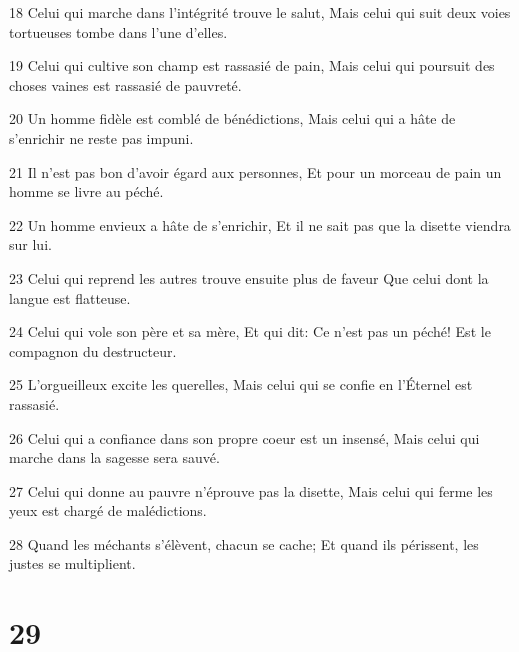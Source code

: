 \par 18 Celui qui marche dans l'intégrité trouve le salut, Mais celui qui suit deux voies tortueuses tombe dans l'une d'elles.
\par 19 Celui qui cultive son champ est rassasié de pain, Mais celui qui poursuit des choses vaines est rassasié de pauvreté.
\par 20 Un homme fidèle est comblé de bénédictions, Mais celui qui a hâte de s'enrichir ne reste pas impuni.
\par 21 Il n'est pas bon d'avoir égard aux personnes, Et pour un morceau de pain un homme se livre au péché.
\par 22 Un homme envieux a hâte de s'enrichir, Et il ne sait pas que la disette viendra sur lui.
\par 23 Celui qui reprend les autres trouve ensuite plus de faveur Que celui dont la langue est flatteuse.
\par 24 Celui qui vole son père et sa mère, Et qui dit: Ce n'est pas un péché! Est le compagnon du destructeur.
\par 25 L'orgueilleux excite les querelles, Mais celui qui se confie en l'Éternel est rassasié.
\par 26 Celui qui a confiance dans son propre coeur est un insensé, Mais celui qui marche dans la sagesse sera sauvé.
\par 27 Celui qui donne au pauvre n'éprouve pas la disette, Mais celui qui ferme les yeux est chargé de malédictions.
\par 28 Quand les méchants s'élèvent, chacun se cache; Et quand ils périssent, les justes se multiplient.

\chapter{29}

